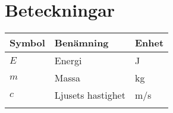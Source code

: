 \section*{Beteckningar}
%
\vspace{-5mm}
\begin{longtable}[l]{@{} l l l @{}}
\toprule\endfirsthead
\textbf{Symbol} & \textbf{Benämning} & \textbf{Enhet} \\
\midrule
    $E$ & Energi & \si{J} \\
    $m$ & Massa & \si{kg} \\
    $c$ & Ljusets hastighet & \si{m/s} \\
\bottomrule \\
\end{longtable}